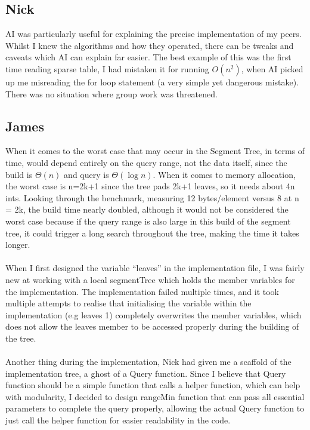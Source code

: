 \documentclass{article}
\theoremstyle{definition}
\begin{document}
\subsection{Nick}
AI was particularly useful for explaining the precise implementation of my peers.  Whilst I knew the algorithms and how they operated, there can be tweaks and caveats which AI can explain far easier.  The best example of this was the first time reading sparse table, I had mistaken it for running $O(n^2)$, when AI picked up me misreading the for loop statement (a very simple yet dangerous mistake).  There was no situation where group work was threatened.

\subsection{James}
When it comes to the worst case that may occur in the Segment Tree, in terms of time, would depend entirely on the query range, not the data itself, since the build is $\Theta(n)$ and query is $\Theta(\log n)$. When it comes to memory allocation, the worst case is n=2k+1 since the tree pads 2k+1 leaves, so it needs about 4n ints. Looking through the benchmark, measuring 12 bytes/element versus 8 at n = 2k, the build time nearly doubled, although it would not be considered the worst case because if the query range is also large in this build of the segment tree, it could trigger a long search throughout the tree, making the time it takes longer.
\\
\\
When I first designed the variable “leaves” in the implementation file, I was fairly new at working with a local segmentTree which holds the member variables for the implementation. The implementation failed multiple times, and it took multiple attempts to realise that initialising the variable within the implementation (e.g leaves {1}) completely overwrites the member variables, which does not allow the leaves member to be accessed properly during the building of the tree.
\\
\\
Another thing during the implementation, Nick had given me a scaffold of the implementation tree, a ghost of a Query function. Since I believe that Query function should be a simple function that calls a helper function, which can help with modularity, I decided to design rangeMin function that can pass all essential parameters to complete the query properly, allowing the actual Query function to just call the helper function for easier readability in the code.
\end{document}
